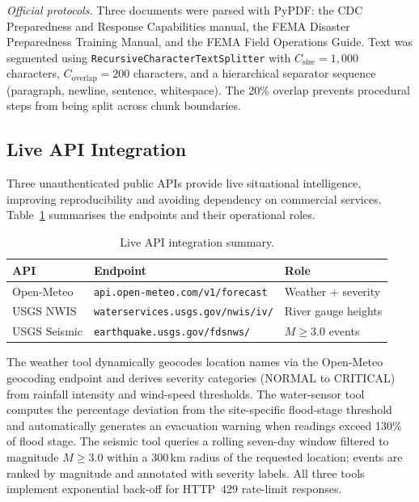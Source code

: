 \textit{Official protocols.} Three documents were parsed with PyPDF: the CDC
Preparedness and Response Capabilities manual, the FEMA Disaster Preparedness
Training Manual, and the FEMA Field Operations Guide. Text was segmented using
\texttt{RecursiveCharacterTextSplitter} with $C_{\text{size}}{=}1{,}000$
characters, $C_{\text{overlap}}{=}200$ characters, and a hierarchical
separator sequence (paragraph, newline, sentence, whitespace). The 20\% overlap
prevents procedural steps from being split across chunk boundaries.

\subsection{Live API Integration}

Three unauthenticated public APIs provide live situational intelligence,
improving reproducibility and avoiding dependency on commercial services.
Table~\ref{tab:apis} summarises the endpoints and their operational roles.

\begin{table}[ht]
\centering
\caption{Live API integration summary.}
\label{tab:apis}
\renewcommand{\arraystretch}{1.2}
\begin{tabular}{@{}lll@{}}
\toprule
\textbf{API} & \textbf{Endpoint} & \textbf{Role} \\ \midrule
Open-Meteo   & \texttt{api.open-meteo.com/v1/forecast} & Weather + severity \\
USGS NWIS    & \texttt{waterservices.usgs.gov/nwis/iv/} & River gauge heights \\
USGS Seismic & \texttt{earthquake.usgs.gov/fdsnws/}     & $M{\geq}3.0$ events \\ \bottomrule
\end{tabular}
\end{table}

The weather tool dynamically geocodes location names via the Open-Meteo
geocoding endpoint and derives severity categories (NORMAL to CRITICAL) from
rainfall intensity and wind-speed thresholds. The water-sensor tool computes
the percentage deviation from the site-specific flood-stage threshold and
automatically generates an evacuation warning when readings exceed 130\% of
flood stage. The seismic tool queries a rolling seven-day window filtered to
magnitude $M{\geq}3.0$ within a 300\,km radius of the requested location;
events are ranked by magnitude and annotated with severity labels. All three
tools implement exponential back-off for HTTP~429 rate-limit responses.

